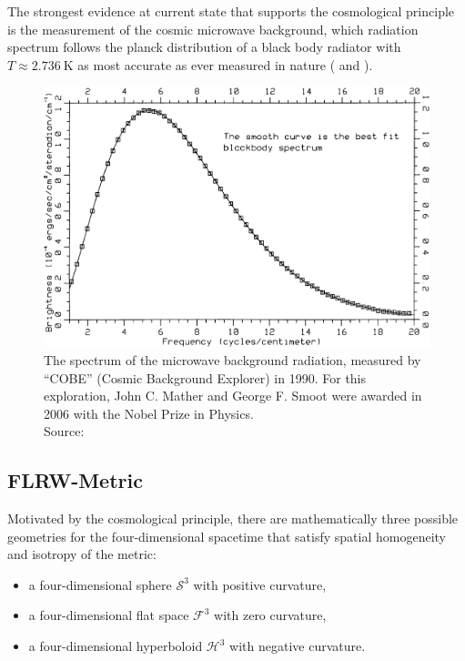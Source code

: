 \noindent The strongest evidence at current state that supports the cosmological principle is the measurement of the cosmic microwave background, which radiation spectrum follows the planck distribution of a black body radiator with $T \approx \SI{2.736}{\kelvin}$ as most accurate as ever measured in nature (\cite[p.~131/132]{Peebles1993} and \cite{White1999}). 

\begin{figure}[H]
    \centering
    \includegraphics[scale=0.34]{figures/images/cmb-blackbody.png}
    \caption[Caption for LOF]{The spectrum of the microwave background radiation, measured by ``COBE'' (Cosmic Background Explorer) in 1990. For this exploration, John C. Mather and George F. Smoot were awarded in 2006 with the Nobel Prize in Physics. \\
    Source: \cite[Figure 2]{Mather1990}}
\end{figure}


\subsection{FLRW-Metric}

Motivated by the cosmological principle, there are mathematically three possible geometries for the four-dimensional spacetime that satisfy spatial homogeneity and isotropy of the metric:
\begin{itemize}
    \item a four-dimensional sphere $\mathcal{S}^{3}$ with positive curvature,
    \item a four-dimensional flat space $\mathcal{F}^{3}$ with zero curvature,
    \item a four-dimensional hyperboloid $\mathcal{H}^{3}$ with negative curvature.
\end{itemize}

